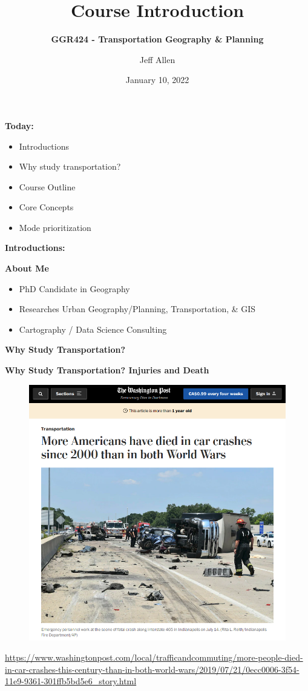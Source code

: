 \documentclass[aspectratio=169]{beamer}
\title{\textbf{Course Introduction}}
\subtitle{\textbf{GGR424 - Transportation Geography \& Planning}}
\author{Jeff Allen}
\institute{University of Toronto}
\date{January 10, 2022}
\begin{document}
	
\begin{frame}
	\titlepage	
\end{frame}



\begin{frame}
\textbf{Today:}
\begin{itemize}
	\item Introductions
	\item Why study transportation?
	\item Course Outline
	\item Core Concepts
	\item Mode prioritization
\end{itemize}
\end{frame}




\begin{frame}
\LARGE{\textbf{Introductions:}}
\end{frame}

\begin{frame}
\textbf{About Me}
\begin{itemize}
	\item PhD Candidate in Geography
	\item Researches Urban Geography/Planning, Transportation, \& GIS
	\item Cartography / Data Science Consulting
\end{itemize}
\end{frame}





\begin{frame}
	\LARGE{\textbf{Why Study Transportation?}}
\end{frame}



\begin{frame}
	\textbf{Why Study Transportation? Injuries and Death}
	\begin{figure}
		\centering
		\includegraphics[width=0.5\linewidth]{images/wash_post_deaths.png}
	\end{figure}
	\tiny\url{https://www.washingtonpost.com/local/trafficandcommuting/more-people-died-in-car-crashes-this-century-than-in-both-world-wars/2019/07/21/0ecc0006-3f54-11e9-9361-301ffb5bd5e6_story.html}
\end{frame}
\end{document}
